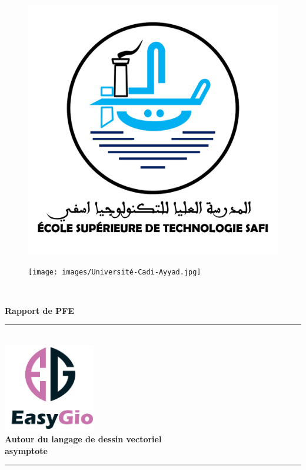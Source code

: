 \documentclass[a4paper]{report}
\newcommand{\HRule}{\rule{\linewidth}{0.5mm}}
\begin{document}
\begin{titlepage}
\begin{figure}[!htb]
   \begin{minipage}{0.48\textwidth}
     \centering
     \includegraphics[width=.7\linewidth]{images/ESTS_logo.png}
   \end{minipage}\hfill
   \begin{minipage}{0.48\textwidth}
     \centering
     \texttt{[image: images/Université-Cadi-Ayyad.jpg]}
   \end{minipage}
\end{figure}~\\[1cm]
\begin{center}
{\huge \bfseries Rapport de PFE}\\[0.4cm]
\HRule \\[0.4cm]
{\huge \bfseries \includegraphics[width=0.3\textwidth]{images/logox2.png}~\\[0.5cm]
Autour du langage de dessin vectoriel \\[0.2cm] asymptote} \\[0.4cm]
\HRule \\[1.5cm]
\begin{minipage}{0.4\textwidth}
\begin{flushleft} \large

\end{flushleft}
\end{minipage}
\end{center}
\end{titlepage}
\end{document}
